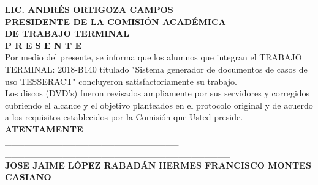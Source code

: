 \documentclass[12pt]{report}
\begin{document}
\begin{flushleft}
	\textbf {LIC. ANDRÉS ORTIGOZA CAMPOS}\\
	\textbf {PRESIDENTE DE LA COMISIÓN ACADÉMICA}\\
	\textbf {DE TRABAJO TERMINAL}\\
	\textbf {P R E S E N T E}\\
	\vspace*{0.3in}
	Por medio del presente, se informa que los alumnos que integran el TRABAJO TERMINAL: 2018-B140 titulado "Sistema generador de documentos de casos de uso TESSERACT" concluyeron satisfactoriamente su trabajo. \\
	\vspace*{0.3in}
	Los discos (DVD's) fueron revisados ampliamente por sus servidores y corregidos cubriendo el alcance y el objetivo planteados en el protocolo original y de acuerdo a los requisitos establecidos por la Comisión que Usted preside.\\
	\vspace*{0.7in}
	\textbf {ATENTAMENTE}\\
	\vspace*{1.0in}
	\_\_\_\_\_\_\_\_\_\_\_\_\_\_\_\_\_\_\_\_\_\_\_\_\_\_\_ \hspace*{1.4in}
	\_\_\_\_\_\_\_\_\_\_\_\_\_\_\_\_\_\_\_\_\_\_\_\_\_\_\_\_\_\_\_\_\_\_\_ \\
	\textbf {JOSE JAIME LÓPEZ RABADÁN}
	\hspace*{1.1in}
	\textbf {HERMES FRANCISCO MONTES CASIANO}\\
\end{flushleft}

\newpage

\vspace*{0.7in}
\end{document}

